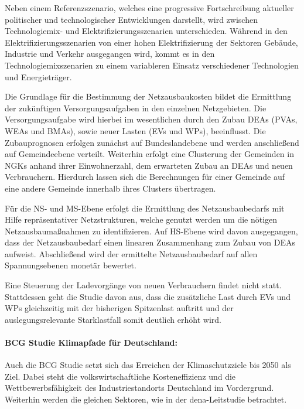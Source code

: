 Neben einem Referenzszenario, welches eine progressive Fortschreibung aktueller politischer und technologischer Entwicklungen darstellt, wird zwischen Technologiemix- und Elektrifizierungsszenarien unterschieden.
Während in den Elektrifizierungsszenarien von einer hohen Elektrifizierung der Sektoren Gebäude, Industrie und Verkehr ausgegangen wird, kommt es in den Technologiemixszenarien zu einem variableren Einsatz verschiedener Technologien und Energieträger.\medskip

Die Grundlage für die Bestimmung der Netzausbaukosten bildet die Ermittlung der zukünftigen Versorgungsaufgaben in den einzelnen Netzgebieten.
Die Versorgungsaufgabe wird hierbei im wesentlichen durch den Zubau \glspl{DEA} (\glspl{PVA}, \glspl{WEA} und \glspl{BMA}), sowie neuer Lasten (\glspl{EV} und \glspl{WP}), beeinflusst.
Die Zubauprognosen erfolgen zunächst auf Bundeslandebene und werden anschließend auf Gemeindeebene verteilt.
Weiterhin erfolgt eine Clusterung der Gemeinden in \glspl{NGK} anhand ihrer Einwohnerzahl, dem erwarteten Zubau an \glspl{DEA} und neuen Verbrauchern.
Hierdurch lassen sich die Berechnungen für einer Gemeinde auf eine andere Gemeinde innerhalb ihres Clusters übertragen.\medskip

Für die \gls{NS}- und \gls{MS}-Ebene erfolgt die Ermittlung des Netzausbaubedarfs mit Hilfe repräsentativer Netzstrukturen, welche genutzt werden um die nötigen Netzausbaumaßnahmen zu identifizieren.
Auf \gls{HS}-Ebene wird davon ausgegangen, dass der Netzausbaubedarf einen linearen Zusammenhang zum Zubau von \glspl{DEA} aufweist.
Abschließend wird der ermittelte Netzausbaubedarf auf allen Spannungsebenen monetär bewertet.\medskip

Eine Steuerung der Ladevorgänge von neuen Verbrauchern findet nicht statt.
Stattdessen geht die Studie davon aus, dass die zusätzliche Last durch \glspl{EV} und \glspl{WP} gleichzeitig mit der bisherigen Spitzenlast auftritt und der auslegungsrelevante Starklastfall somit deutlich erhöht wird.

\paragraph{BCG Studie \glqq Klimapfade für Deutschland\grqq:}

Auch die BCG Studie setzt sich das Erreichen der Klimaschutzziele bis \num{2050} als Ziel.
Dabei steht die volkswirtschaftliche Kosteneffizienz und die Wettbewerbsfähigkeit des Industriestandorts Deutschland im Vordergrund.
Weiterhin werden die gleichen Sektoren, wie in der dena-Leitstudie betrachtet. \medskip

